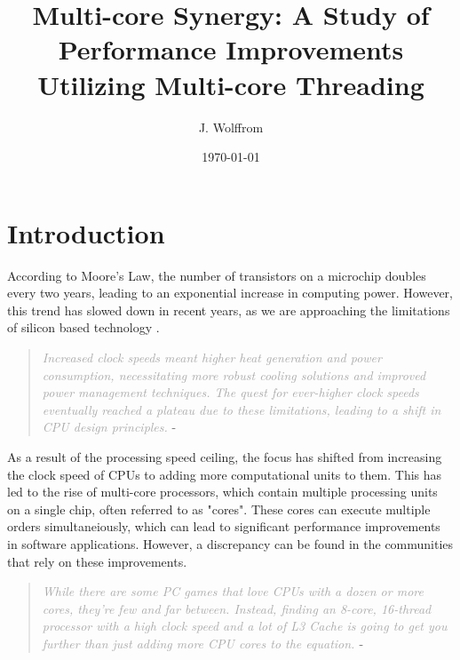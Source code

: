 \documentclass{article}
\title{Multi-core Synergy: A Study of Performance Improvements Utilizing Multi-core Threading}
\author{J. Wolffrom}
\date{\today}
\begin{document}
\maketitle
\newpage

\begin{abstract}

\end{abstract}
\newpage

\tableofcontents
\newpage

\section{Introduction}

According to Moore's Law, the number of transistors on a microchip doubles every two years, leading to an exponential increase in computing power. However, this trend has slowed down in recent years, as we are approaching the limitations of silicon based technology \parencite{Mattson2014}.

\begin{quote}
    \textit{\textcolor{darkgray}{Increased clock speeds meant higher heat generation and power consumption, necessitating more robust cooling solutions and improved power management techniques. The quest for ever-higher clock speeds eventually reached a plateau due to these limitations, leading to a shift in CPU design principles.}} - \parencite{mscodes} 
\end{quote}

As a result of the processing speed ceiling, the focus has shifted from increasing the clock speed of CPUs to adding more computational units to them. This has led to the rise of multi-core processors, which contain multiple processing units on a single chip, often referred to as "cores". These cores can execute multiple orders simultaneiously, which can lead to significant performance improvements in software applications. However, a discrepancy can be found in the communities that rely on these improvements.

\begin{quote}
    \textit{\textcolor{darkgray}{While there are some PC games that love CPUs with a dozen or more cores, they’re few and far between. 
    Instead, finding an 8-core, 16-thread processor with a high clock speed and a lot of L3 Cache is going to get you further than just adding more CPU cores to the equation. }} 
    - \parencite{Thomas2025}
\end{quote}
\end{document}
